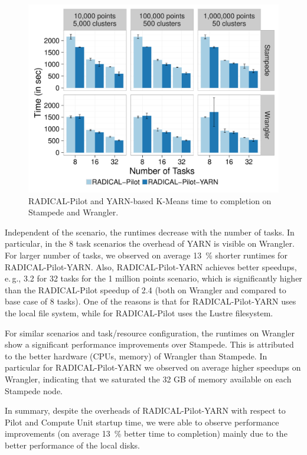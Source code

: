 \begin{figure}[t]
    \centering
    \includegraphics[width=.75\textwidth]{figures/data_analytics_hpc/hpc_hadoop/kmeans.pdf}
    \caption{RADICAL-Pilot and YARN-based K-Means time to completion on Stampede and Wrangler.}
    \label{fig:experiments_kmeans_rpyarnkmeans}
\end{figure}

Independent of the scenario, the runtimes decrease with the number of tasks.
In particular, in the 8 task scenarios the overhead of YARN is visible on Wrangler.
For larger number of tasks, we observed on average 13~\% shorter runtimes for RADICAL-Pilot-YARN.
Also, RADICAL-Pilot-YARN achieves better speedups, e.\,g., 3.2 for 32 tasks for the 1 million points scenario, which is significantly higher than the RADICAL-Pilot speedup of 2.4 (both on Wrangler and compared to base case of 8 tasks).
One of the reasons is that for RADICAL-Pilot-YARN uses the local file system, while for RADICAL-Pilot uses the Lustre filesystem.

For similar scenarios and task/resource configuration, the runtimes on Wrangler show a significant performance improvements over Stampede.
This is attributed to the better hardware (CPUs, memory) of Wrangler than Stampede.
In particular for RADICAL-Pilot-YARN we observed on average higher speedups on Wrangler, indicating that we saturated the 32 GB of memory available on each Stampede node.

In summary, despite the overheads of RADICAL-Pilot-YARN with respect to Pilot and Compute Unit startup time, we were able to observe performance improvements (on average 13~\% better time to completion) mainly due to the better performance of the local disks.


